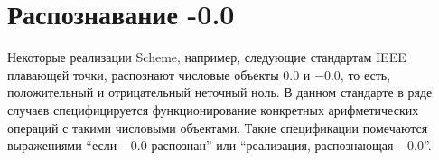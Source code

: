 \section{Распознавание -0.0}\vspace{-2mm}

 Некоторые реализации Scheme, например, следующие стандартам IEEE
плавающей точки, распознают числовые объекты $0.0$ и $-0.0$, то есть, положительный и
отрицательный неточный ноль. В данном стандарте в ряде случаев специфицируется функционирование
конкретных арифметических операций с такими числовыми объектами. Такие спецификации помечаются
выражениями ``если $-0.0$ распознан'' или ``реализация, распознающая $-0.0$''.\vspace{-4mm}

